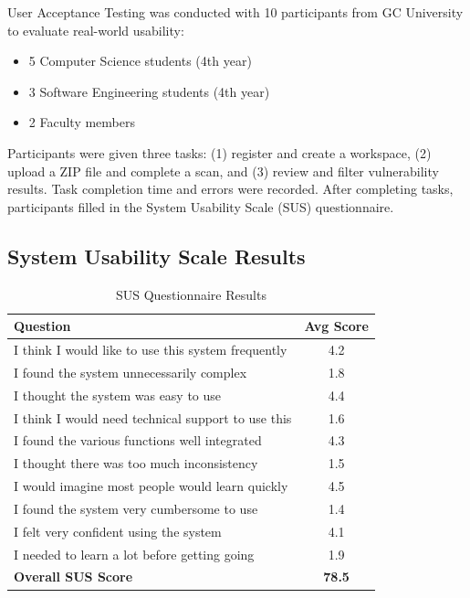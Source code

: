 \documentclass[12pt,a4paper]{report}
\begin{document}
User Acceptance Testing was conducted with 10 participants from GC University to evaluate real-world usability:
\begin{itemize}
    \item 5 Computer Science students (4th year)
    \item 3 Software Engineering students (4th year)
    \item 2 Faculty members
\end{itemize}

Participants were given three tasks: (1) register and create a workspace, (2) upload a ZIP file and complete a scan, and (3) review and filter vulnerability results. Task completion time and errors were recorded. After completing tasks, participants filled in the System Usability Scale (SUS) questionnaire.

\subsection{System Usability Scale Results}

\begin{table}[H]
\centering
\caption{SUS Questionnaire Results}
\label{tab:sus_results}
\begin{tabular}{|p{8cm}|c|}
\hline
\textbf{Question} & \textbf{Avg Score} \\
\hline
I think I would like to use this system frequently & 4.2 \\
\hline
I found the system unnecessarily complex & 1.8 \\
\hline
I thought the system was easy to use & 4.4 \\
\hline
I think I would need technical support to use this & 1.6 \\
\hline
I found the various functions well integrated & 4.3 \\
\hline
I thought there was too much inconsistency & 1.5 \\
\hline
I would imagine most people would learn quickly & 4.5 \\
\hline
I found the system very cumbersome to use & 1.4 \\
\hline
I felt very confident using the system & 4.1 \\
\hline
I needed to learn a lot before getting going & 1.9 \\
\hline
\textbf{Overall SUS Score} & \textbf{78.5} \\
\hline
\end{tabular}
\end{table}
\end{document}
